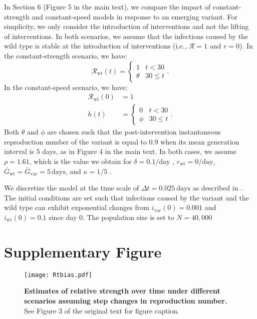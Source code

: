\documentclass[12pt]{article}
\newcommand{\vvvar}{\mathrm{var}}
\newcommand{\wwwt}{\mathrm{wt}}
\newcommand{\rx}[1]{\ensuremath{{r}_{#1}}\xspace}
\newcommand{\rw}{\rx{\wwwt}}
\newcommand{\Rx}[1]{\ensuremath{{\mathcal R}_{#1}}\xspace}
\newcommand{\RR}{\ensuremath{{\mathcal R}}\xspace}
\newcommand{\Rw}{\Rx{\wwwt}}
\newcommand{\pday}{\ensuremath{/\textrm{day}}}
\newcommand{\ix}[1]{\ensuremath{{i}_{#1}}\xspace}
\newcommand{\iw}{\ix{\wwwt}}
\newcommand{\iv}{\ix{\vvvar}}
\newcommand{\Gx}[1]{\ensuremath{{\bar G}_{#1}}\xspace}
\newcommand{\Gw}{\Gx{\wwwt}}
\newcommand{\Gv}{\Gx{\vvvar}}
\begin{document}
In Section 6 (Figure 5 in the main text), we compare the impact of constant-strength and constant-speed models in response to an emerging variant.
For simplicity, we only consider the introduction of interventions and not the lifting of interventions.
In both scenarios, we assume that the infections caused by the wild type is stable at the introduction of interventions (i.e., $\RR=1$ and $r=0$).
In the constant-strength scenario, we have: 
\begin{equation}
\Rw(t) = \begin{cases}
1 & t < 30\\
\theta & 30 \leq t
\end{cases}.
\end{equation}
In the constant-speed scenario, we have: 
\begin{align}
\Rw(0) &= 1\\
h(t) &= \begin{cases}
0 & t < 30\\
\phi & 30 \leq t
\end{cases}.
\end{align}
Both $\theta$ and $\phi$ are chosen such that the post-intervention instantaneous reproduction number of the variant is equal to 0.9 when its mean generation interval is 5 days, as in Figure 4 in the main text.
In both cases, we assume $\rho = 1.61$, which is the value we obtain for $\delta=0.1\pday$ \citep{davies2021estimated}, $\rw=0\pday$, $\Gw = \Gv = 5\,\textrm{days}$, and $\kappa = 1/5$ \citep{ferretti2020quantifying}.

We discretize the model at the time scale of $\Delta t =0.025\ \textrm{days}$ as described in \cite{park2021forward}.
The initial conditions are set such that infections caused by the variant and the wild type can exhibit exponential changes from $\iv(0) = 0.001$ and $\iw(0) = 0.1$ since day 0.
The population size is set to $N=40,000$

\pagebreak

\section*{Supplementary Figure}

\setcounter{figure}{0}    
\renewcommand\thefigure{S\arabic{figure}}    

\begin{figure}[!pht]
\begin{center}
\texttt{[image: Rtbias.pdf]}
\caption{
\textbf{Estimates of relative strength over time under different scenarios assuming step changes in reproduction number.}
See Figure 3 of the original text for figure caption.
}
\end{center}
\end{figure}


\pagebreak


\end{document}
